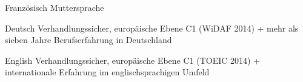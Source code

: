 

\begin{cvskills}
  \cvskill
    {Französisch} %
    {Muttersprache} %
    
  \cvskill
	{Deutsch} %
	{Verhandlungssicher, europäische Ebene C1 (WiDAF 2014) + mehr als sieben Jahre Berufserfahrung in Deutschland} %
	
  \cvskill
	{English} %
	{Verhandlungssicher, europäische Ebene C1 (TOEIC 2014) + internationale Erfahrung im englischsprachigen Umfeld} %
	
\end{cvskills}

